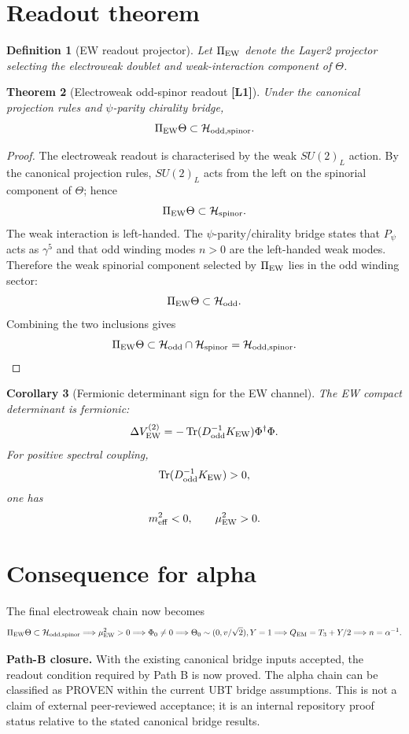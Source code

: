 \documentclass[12pt,a4paper]{article}
\newtheorem{definition}{Definition}[section]
\newtheorem{theorem}[definition]{Theorem}
\newtheorem{corollary}[definition]{Corollary}
\newcommand{\Lone}{\textbf{[L1]}}
\begin{document}
\section{Readout theorem}

\begin{definition}[EW readout projector]
Let $\Pi_{\rm EW}$ denote the Layer2 projector selecting the electroweak doublet
and weak-interaction component of $\Theta$.
\end{definition}

\begin{theorem}[Electroweak odd-spinor readout \Lone]
Under the canonical projection rules and $\psi$-parity chirality bridge,
\[
  \Pi_{\rm EW}\Theta
  \subset
  \mathcal H_{\rm odd,spinor}.
\]
\end{theorem}

\begin{proof}
The electroweak readout is characterised by the weak $SU(2)_L$ action.  By the
canonical projection rules, $SU(2)_L$ acts from the left on the spinorial
component of $\Theta$; hence
\[
  \Pi_{\rm EW}\Theta\subset\mathcal H_{\rm spinor}.
\]
The weak interaction is left-handed.  The $\psi$-parity/chirality bridge states
that $P_\psi$ acts as $\gamma^5$ and that odd winding modes $n>0$ are the
left-handed weak modes.  Therefore the weak spinorial component selected by
$\Pi_{\rm EW}$ lies in the odd winding sector:
\[
  \Pi_{\rm EW}\Theta\subset\mathcal H_{\rm odd}.
\]
Combining the two inclusions gives
\[
  \Pi_{\rm EW}\Theta
  \subset
  \mathcal H_{\rm odd}\cap\mathcal H_{\rm spinor}
  =
  \mathcal H_{\rm odd,spinor}.
\]
\end{proof}

\begin{corollary}[Fermionic determinant sign for the EW channel]
The EW compact determinant is fermionic:
\[
  \Delta V_{\rm EW}^{(2)}
  =
  -\operatorname{Tr}(D_{\rm odd}^{-1}K_{\rm EW})\Phi^\dagger\Phi.
\]
For positive spectral coupling,
\[
  \operatorname{Tr}(D_{\rm odd}^{-1}K_{\rm EW})>0,
\]
one has
\[
  m_{\rm eff}^2<0,
  \qquad
  \mu_{\rm EW}^2>0.
\]
\end{corollary}

\section{Consequence for alpha}

The final electroweak chain now becomes
\[
  \Pi_{\rm EW}\Theta\subset\mathcal H_{\rm odd,spinor}
  \Longrightarrow
  \mu_{\rm EW}^2>0
  \Longrightarrow
  \Phi_0\ne0
  \Longrightarrow
  \Theta_0\sim(0,v/\sqrt2),Y=1
  \Longrightarrow
  Q_{\rm EM}=T_3+Y/2
  \Longrightarrow
  n=\alpha^{-1}.
\]

\begin{resultbox}
\textbf{Path-B closure.} With the existing canonical bridge inputs accepted,
the readout condition required by Path B is now proved.  The alpha chain can be
classified as PROVEN within the current UBT bridge assumptions.  This is not a
claim of external peer-reviewed acceptance; it is an internal repository proof
status relative to the stated canonical bridge results.
\end{resultbox}

\ifdefined\INCLUDEMODE\else
\end{document}
